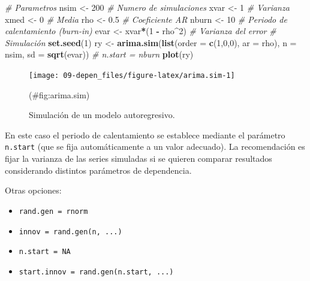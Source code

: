 \documentclass[]{book}
\newenvironment{Shaded}{\begin{snugshade}}{\end{snugshade}}
\newcommand{\KeywordTok}[1]{\textcolor[rgb]{0.13,0.29,0.53}{\textbf{#1}}}
\newcommand{\DataTypeTok}[1]{\textcolor[rgb]{0.13,0.29,0.53}{#1}}
\newcommand{\DecValTok}[1]{\textcolor[rgb]{0.00,0.00,0.81}{#1}}
\newcommand{\FloatTok}[1]{\textcolor[rgb]{0.00,0.00,0.81}{#1}}
\newcommand{\StringTok}[1]{\textcolor[rgb]{0.31,0.60,0.02}{#1}}
\newcommand{\CommentTok}[1]{\textcolor[rgb]{0.56,0.35,0.01}{\textit{#1}}}
\newcommand{\OperatorTok}[1]{\textcolor[rgb]{0.81,0.36,0.00}{\textbf{#1}}}
\newcommand{\NormalTok}[1]{#1}
\theoremstyle{definition}
\theoremstyle{definition}
\theoremstyle{definition}
\theoremstyle{remark}
\begin{document}
\begin{Shaded}
\begin{Highlighting}[]
\CommentTok{# Parametros}
\NormalTok{nsim <-}\StringTok{ }\DecValTok{200}   \CommentTok{# Numero de simulaciones}
\NormalTok{xvar <-}\StringTok{ }\DecValTok{1}     \CommentTok{# Varianza}
\NormalTok{xmed <-}\StringTok{ }\DecValTok{0}     \CommentTok{# Media}
\NormalTok{rho <-}\StringTok{ }\FloatTok{0.5}    \CommentTok{# Coeficiente AR}
\NormalTok{nburn <-}\StringTok{ }\DecValTok{10}   \CommentTok{# Periodo de calentamiento (burn-in)}
\NormalTok{evar <-}\StringTok{ }\NormalTok{xvar}\OperatorTok{*}\NormalTok{(}\DecValTok{1} \OperatorTok{-}\StringTok{ }\NormalTok{rho}\OperatorTok{^}\DecValTok{2}\NormalTok{) }\CommentTok{# Varianza del error}
\CommentTok{# Simulación}
\KeywordTok{set.seed}\NormalTok{(}\DecValTok{1}\NormalTok{)}
\NormalTok{ry <-}\StringTok{ }\KeywordTok{arima.sim}\NormalTok{(}\KeywordTok{list}\NormalTok{(}\DataTypeTok{order =} \KeywordTok{c}\NormalTok{(}\DecValTok{1}\NormalTok{,}\DecValTok{0}\NormalTok{,}\DecValTok{0}\NormalTok{), }\DataTypeTok{ar =}\NormalTok{ rho), }
            \DataTypeTok{n =}\NormalTok{ nsim, }\DataTypeTok{sd =} \KeywordTok{sqrt}\NormalTok{(evar)) }\CommentTok{# n.start = nburn}
\KeywordTok{plot}\NormalTok{(ry)}
\end{Highlighting}
\end{Shaded}

\begin{figure}[!htb]

{\centering \texttt{[image: 09-depen\_files/figure-latex/arima.sim-1]} 

}

\caption{Simulación de un modelo autoregresivo.}(\#fig:arima.sim)
\end{figure}

En este caso el periodo de calentamiento se establece mediante el
parámetro \texttt{n.start} (que se fija automáticamente a un valor
adecuado). La recomendación es fijar la varianza de las series simuladas
si se quieren comparar resultados considerando distintos parámetros de
dependencia.

Otras opciones:

\begin{itemize}
\item
  \texttt{rand.gen\ =\ rnorm}
\item
  \texttt{innov\ =\ rand.gen(n,\ ...)}
\item
  \texttt{n.start\ =\ NA}
\item
  \texttt{start.innov\ =\ rand.gen(n.start,\ ...)}
\end{itemize}
\end{document}
